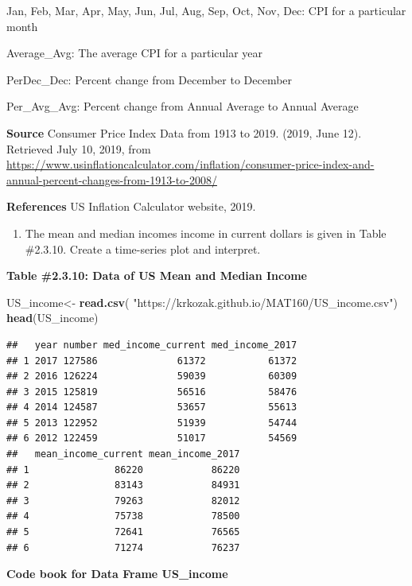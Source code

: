 \documentclass[
]{book}
\newenvironment{Shaded}{\begin{snugshade}}{\end{snugshade}}
\newcommand{\KeywordTok}[1]{\textcolor[rgb]{0.13,0.29,0.53}{\textbf{#1}}}
\newcommand{\NormalTok}[1]{#1}
\newcommand{\StringTok}[1]{\textcolor[rgb]{0.31,0.60,0.02}{#1}}
\providecommand{\tightlist}{%
  \setlength{\itemsep}{0pt}\setlength{\parskip}{0pt}}
\begin{document}
Jan, Feb, Mar, Apr, May, Jun, Jul, Aug, Sep, Oct, Nov, Dec: CPI for a particular month

Average\_Avg: The average CPI for a particular year

PerDec\_Dec: Percent change from December to December

Per\_Avg\_Avg: Percent change from Annual Average to Annual Average

\textbf{Source}
Consumer Price Index Data from 1913 to 2019. (2019, June 12). Retrieved July 10, 2019, from \url{https://www.usinflationcalculator.com/inflation/consumer-price-index-and-annual-percent-changes-from-1913-to-2008/}

\textbf{References}
US Inflation Calculator website, 2019.

\begin{enumerate}
\def\labelenumi{\arabic{enumi}.}
\setcounter{enumi}{7}
\tightlist
\item
  The mean and median incomes income in current dollars is given in Table \#2.3.10. Create a time-series plot and interpret.
\end{enumerate}

\textbf{Table \#2.3.10: Data of US Mean and Median Income}

\begin{Shaded}
\begin{Highlighting}[]
\NormalTok{US_income<-}\StringTok{ }\KeywordTok{read.csv}\NormalTok{(}
  \StringTok{"https://krkozak.github.io/MAT160/US_income.csv"}\NormalTok{)}
\KeywordTok{head}\NormalTok{(US_income)}
\end{Highlighting}
\end{Shaded}

\begin{verbatim}
##   year number med_income_current med_income_2017
## 1 2017 127586              61372           61372
## 2 2016 126224              59039           60309
## 3 2015 125819              56516           58476
## 4 2014 124587              53657           55613
## 5 2013 122952              51939           54744
## 6 2012 122459              51017           54569
##   mean_income_current mean_income_2017
## 1               86220            86220
## 2               83143            84931
## 3               79263            82012
## 4               75738            78500
## 5               72641            76565
## 6               71274            76237
\end{verbatim}

\textbf{Code book for Data Frame US\_income}
\end{document}
